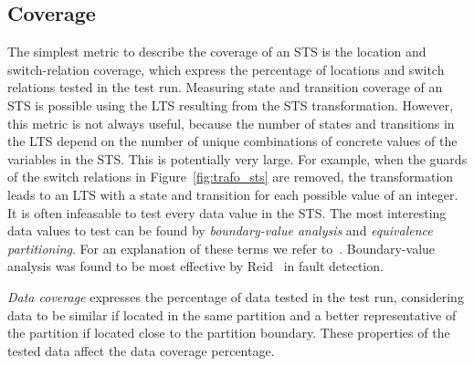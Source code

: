 \subsection{Coverage}\label{sec:sts_coverage}
The simplest metric to describe the coverage of an STS is the location and switch-relation coverage, which express the percentage of locations and switch relations tested in the test run. Measuring state and transition coverage of an STS is possible using the LTS resulting from the STS transformation. However, this metric is not always useful, because the number of states and transitions in the LTS depend on the number of unique combinations of concrete values of the variables in the STS. This is potentially very large. For example, when the guards of the switch relations in Figure~\ref{fig:trafo_sts} are removed, the transformation leads to an LTS with a state and transition for each possible value of an integer. It is often infeasable to test every data value in the STS. The most interesting data values to test can be found by \textit{boundary-value analysis} and \textit{equivalence partitioning}. For an explanation of these terms we refer to~\cite{Myers:2004}. Boundary-value analysis was found to be most effective by Reid~\cite{Reid:partitioning} in fault detection.

\textit{Data coverage} expresses the percentage of data tested in the test run, considering data to be similar if located in the same partition and a better representative of the partition if located close to the partition boundary. These properties of the tested data affect the data coverage percentage.
